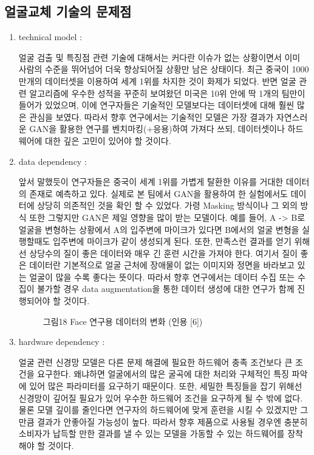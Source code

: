 \documentclass{oblivoir}
\begin{document}
\subsection{얼굴교체 기술의 문제점}
\begin{enumerate}
    \item technical model : 
    
    얼굴 검출 및 특징점 관련 기술에 대해서는 커다란 이슈가 없는 상황이면서 이미 사람의 수준을 뛰어넘어 더욱 향상되어질 상황만 남은 상태이다. 최근 중국이 1000만개의 데이터셋을 이용하여 세계 1위를 차지한 것이 화제가 되었다. 반면 얼굴 관련 알고리즘에 우수한 성적을 꾸준히 보여왔던 미국은 10위 안에 딱 1개의 팀만이 들어가 있었으며, 이에 연구자들은 기술적인 모델보다는 데이터셋에 대해 훨씬 많은 관심을 보였다. 따라서 향후 연구에서는 기술적인 모델은 가장 결과가 자연스러운 GAN을 활용한 연구를 벤치마킹(+응용)하여 가져다 쓰되, 데이터셋이나 하드웨어에 대한 깊은 고민이 있어야 할 것이다.
    
    \item data dependency : 
    
    앞서 말했듯이 연구자들은 중국이 세계 1위를 가볍게 탈환한 이유를 거대한 데이터의 존재로 예측하고 있다. 실제로 본 팀에서 GAN을 활용하여 한 실험에서도 데이터에 상당히 의존적인 것을 확인 할 수 있었다. 가령 Masking 방식이나 그 외의 방식 또한 그렇지만 GAN은 제일 영향을 많이 받는 모델이다. 예를 들어, A -> B로 얼굴을 변형하는 상황에서 A의 입주변에 마이크가 있다면 B에서의 얼굴 변형을 실행할때도 입주변에 마이크가 같이 생성되게 된다. 또한, 만족스런 결과를 얻기 위해선 상당수의 질이 좋은 데이터와 매우 긴 훈련 시간을 가져야 한다. 여기서 질이 좋은 데이터란 기본적으로 얼굴 근처에 장애물이 없는 이미지와 정면을 바라보고 있는 얼굴이 많을 수록 좋다는 뜻이다. 따라서 향후 연구에서는 데이터 수집 또는 수집이 불가할 경우 data augmentation을 통한 데이터 생성에 대한 연구가 함께 진행되어야 할 것이다.
    
    \begin{figure}[h!]
        \centering
    \caption{그림18  Face 연구용 데이터의 변화 (인용 [6])}
    \end{figure}

    
    \item hardware dependency : 
    
    얼굴 관련 신경망 모델은 다른 문제 해결에 필요한 하드웨어 충족 조건보다 큰 조건을 요구한다. 왜냐하면 얼굴에서의 많은 굴곡에 대한 처리와 구체적인 특징 파악에 있어 많은 파라미터를 요구하기 때문이다. 또한, 세밀한 특징들을 잡기 위해선 신경망이 깊어질 필요가 있어 우수한 하드웨어 조건을 요구하게 될 수 밖에 없다. 물론 모델 깊이를 줄인다면 연구자의 하드웨어에 맞게 훈련을 시킬 수 있겠지만 그만큼 결과가 안좋아질 가능성이 높다. 따라서 향후 제품으로 사용될 경우엔 충분히 소비자가 납득할 만한 결과를 낼 수 있는 모델을 가동할 수 있는 하드웨어를 장착해야 할 것이다. 
    

\end{enumerate}
\end{document}
